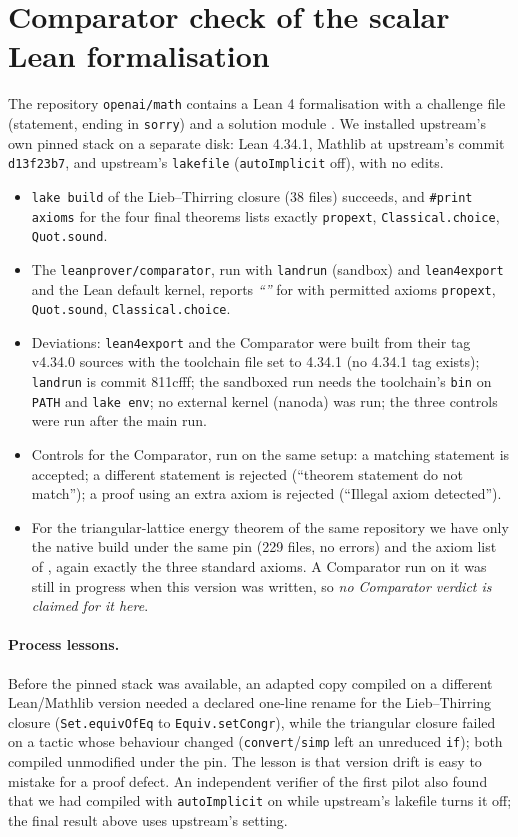 \documentclass[11pt]{article}
\theoremstyle{remark}
\begin{document}
\section{Comparator check of the scalar Lean formalisation}
The repository \texttt{openai/math} contains a Lean 4 formalisation with a challenge file  (statement, ending in \texttt{sorry}) and a solution module .
We installed upstream's own pinned stack on a separate disk: Lean 4.34.1, Mathlib at upstream's commit \texttt{d13f23b7}, and upstream's \texttt{lakefile} (\texttt{autoImplicit} off), with no edits.
\begin{itemize}
\item \texttt{lake build} of the Lieb--Thirring closure (38 files) succeeds, and \texttt{\#print axioms} for the four final theorems lists exactly \texttt{propext}, \texttt{Classical.choice}, \texttt{Quot.sound}.
\item The \texttt{leanprover/comparator}, run with \texttt{landrun} (sandbox) and \texttt{lean4export} and the Lean default kernel, reports \emph{``\CmpOutput''} for 
with permitted axioms \texttt{propext}, \texttt{Quot.sound}, \texttt{Classical.choice}.
\item Deviations: \texttt{lean4export} and the Comparator were built from their tag v4.34.0 sources with the toolchain file set to 4.34.1 (no 4.34.1 tag exists); \texttt{landrun} is commit 811cfff; the sandboxed run needs the toolchain's \texttt{bin} on \texttt{PATH} and \texttt{lake env};
no external kernel (nanoda) was run; the three controls were run after the main run.
\item Controls for the Comparator, run on the same setup: a matching statement is accepted; a different statement is rejected (``theorem statement do not match''); a proof using an extra axiom is rejected (``Illegal axiom detected'').
\item For the triangular-lattice energy theorem of the same repository we have only the native build under the same pin (229 files, no errors) and
the axiom list of , again exactly the three standard axioms. A Comparator run on it was still in progress when this version was written,
so \emph{no Comparator verdict is claimed for it here}.
\end{itemize}
\paragraph{Process lessons.} Before the pinned stack was available, an adapted copy compiled on a different Lean/Mathlib version needed a declared one-line rename for the Lieb--Thirring closure (\texttt{Set.equivOfEq} to \texttt{Equiv.setCongr}),
while the triangular closure failed on a tactic whose behaviour changed (\texttt{convert}/\texttt{simp} left an unreduced \texttt{if}); both compiled unmodified under the pin. The lesson is that version drift is easy to mistake for a proof defect.
An independent verifier of the first pilot also found that we had compiled with \texttt{autoImplicit} on while upstream's lakefile turns it off; the final result above uses upstream's setting.
\end{document}
